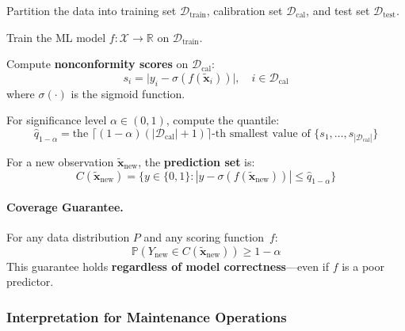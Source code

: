 \documentclass[12pt, a4paper]{article}
\newcommand{\Prob}{\mathbb{P}}
\newcommand{\R}{\mathbb{R}}
\begin{document}
Partition the data into training set $\mathcal{D}_{\mathrm{train}}$, calibration set $\mathcal{D}_{\mathrm{cal}}$, and test set $\mathcal{D}_{\mathrm{test}}$.

\begin{description}[leftmargin=1.5em, labelindent=0em]
    \item[Step 1.] Train the ML model $f\colon \mathcal{X} \to \R$ on $\mathcal{D}_{\mathrm{train}}$.
    
    \item[Step 2.] Compute \textbf{nonconformity scores} on $\mathcal{D}_{\mathrm{cal}}$:
    \begin{equation}
        s_i = \bigl|y_i - \sigma(f(\tilde{\mathbf{x}}_i))\bigr|, \quad i \in \mathcal{D}_{\mathrm{cal}}
    \end{equation}
    where $\sigma(\cdot)$ is the sigmoid function.
    
    \item[Step 3.] For significance level $\alpha \in (0,1)$, compute the quantile:
    \begin{equation}
        \hat{q}_{1-\alpha} = \text{the } \bigl\lceil(1-\alpha)(|\mathcal{D}_{\mathrm{cal}}|+1)\bigr\rceil\text{-th smallest value of } \{s_1, \ldots, s_{|\mathcal{D}_{\mathrm{cal}}|}\}
    \end{equation}
    
    \item[Step 4.] For a new observation $\tilde{\mathbf{x}}_{\mathrm{new}}$, the \textbf{prediction set} is:
    \begin{equation}\label{eq:conformal-set}
        C(\tilde{\mathbf{x}}_{\mathrm{new}}) = \bigl\{y \in \{0,1\} : |y - \sigma(f(\tilde{\mathbf{x}}_{\mathrm{new}}))| \leq \hat{q}_{1-\alpha}\bigr\}
    \end{equation}
\end{description}

\paragraph{Coverage Guarantee.} For any data distribution $P$ and any scoring function~$f$:
\begin{equation}
    \Prob\!\left(Y_{\mathrm{new}} \in C(\tilde{\mathbf{x}}_{\mathrm{new}})\right) \geq 1 - \alpha
\end{equation}
This guarantee holds \textbf{regardless of model correctness}---even if $f$ is a poor predictor.

\subsubsection{Interpretation for Maintenance Operations}
\end{document}
